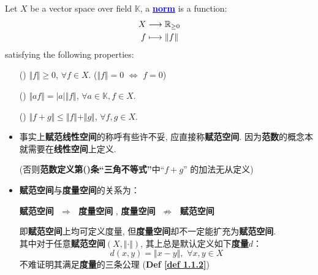 	\begin{defn}\label{def 2.1.1}
		Let $X$ be a vector space over field $\mathbb{K}$, a \underline{\textcolor{blue}{\textbf{norm}}} is a function:
		\begin{align}
			X &\longrightarrow \mathbb{R}_{\geq 0} \\
			f &\longmapsto \Vert f \Vert
		\end{align}
		satisfying the following properties:
		\begin{enumerate}
			\item[(\rmnum{1})]$\Vert f \Vert \geq 0$, $\forall f \in X$. \hspace*{3em} ($\Vert f \Vert = 0 \,\, \Leftrightarrow \,\, f = 0$)
			
			\item[(\rmnum{2})]$\Vert af \Vert = \left| a \right| \Vert f \Vert$, $\forall a \in \mathbb{K}, f \in X$.
			
			\item[(\rmnum{3})]$\Vert f + g \Vert \leq \Vert f \Vert + \Vert g \Vert$, $\forall f , g \in X$.
		\end{enumerate}
		
		\vspace*{0.5em}
		
		\begin{rmk}
			\begin{itemize}
				\item 事实上\textbf{赋范线性空间}的称呼有些许不妥, 应直接称\textbf{赋范空间}. 因为\textbf{范数}的概念本就需要在\textbf{线性空间}上定义. 
				\begin{center}
					(否则\textbf{范数定义第()条“三角不等式”}中“$f + g$” 的加法无从定义)
				\end{center}
				
				\vspace*{2em}
				
				\item \textbf{赋范空间}与\textbf{度量空间}的关系为：
				\begin{center}
					\textbf{赋范空间} $\,\, \Rightarrow \,\,$ \textbf{度量空间} 
					\hspace*{1em} , \hspace*{1em} 
					\textbf{度量空间} $\,\, \not\Rightarrow \,\,$ \textbf{赋范空间}
				\end{center}
				即\textbf{赋范空间}上均可定义度量, 但\textbf{度量空间}却不一定能扩充为\textbf{赋范空间}. \\ 其中对于任意\textbf{赋范空间}$(X , \Vert \cdot \Vert)$, 其上总是默认定义如下\textbf{度量$d$}：
				\[ d(x , y) = \Vert x - y \Vert , \,\, \forall x , y \in X \]
				不难证明其满足\textbf{度量}的三条公理 (\textbf{Def \ref{def 1.1.2}})
				

\end{itemize}
\end{rmk}
\end{defn}
